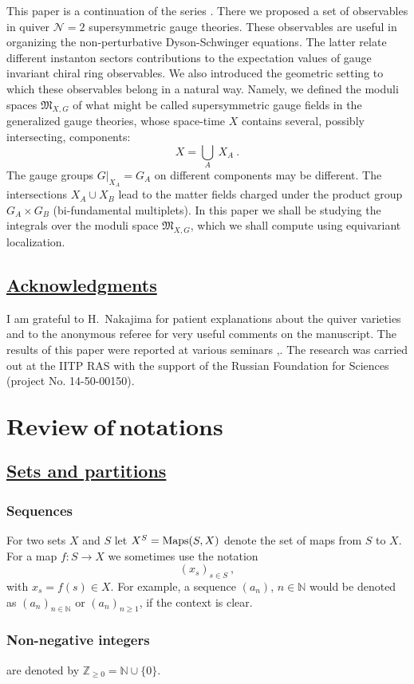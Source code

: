 \documentclass[12pt]{amsart}
\newcommand {\3}{\underline{\bf 3}}
\newcommand {\4}{\underline{\bf 4}}
\newcommand {\6}{\underline{\bf 6}}
\newcommand{\beq}{\begin{equation}}
\newcommand{\eeq}{\end{equation}}
\newcommand{\mM}{{\mathfrak M}}
\newcommand {\BN}   {\mathbb N}
\newcommand {\BZ}   {\mathbb Z}
\newcommand {\CalN} {\mathcal N}
\newcommand{\subsec}[1]{\subsection{\underline{\bf #1}}}
\newcommand{\secc}[1]{\section{$\mathbf{ #1}$}}
\begin{document}
This paper is a continuation of the series \cite{Nekrasov:2015wsu, Nekrasov:2016qym}. 
There we proposed a set of observables in quiver ${\CalN}=2$ supersymmetric gauge theories. These observables
are useful in organizing the non-perturbative Dyson-Schwinger equations. The latter relate different instanton sectors contributions to the expectation values of gauge invariant chiral ring observables. We also introduced the geometric
setting to which these observables belong in a natural way. Namely, we defined the moduli spaces ${\mM}_{X, G}$ of what might be called supersymmetric gauge fields in the generalized gauge theories, whose space-time $X$ contains several, possibly intersecting, components:
\beq
X = \bigcup\limits_{A}\ X_{A}\ . 
\eeq
The gauge groups $G\vert_{X_{A}} = G_{A}$ on different components may be different. The intersections $X_{A} \cup X_{B}$ lead to the matter fields charged under the product group $G_{A} \times G_{B}$ (bi-fundamental multiplets).  In this paper we shall be studying the integrals over the moduli space ${\mM}_{X,G}$, which we shall compute using equivariant localization. 


\subsec{Acknowledgments}

I am grateful to H.~Nakajima for patient explanations about the quiver varieties and to the anonymous referee for very useful comments on the manuscript. 
The results of this paper were reported at various seminars \cite{Nekrasov:IPPI},\cite{Nekrasov:SCGP}. 
The  research  was  carried  out  at  the  IITP RAS  with the support  of  the  Russian  Foundation  for  Sciences (project No. 14-50-00150). 


\secc{Review\ of\ notations}\label{aba:sec2}


\subsec{Sets and partitions}


\subsubsection{Sequences}
For two sets $X$ and $S$ let $X^{S} = {\rm Maps}(S, X)$ denote the set of maps from $S$
to $X$. For a map $f: S \to X$ we sometimes use the notation
 \beq
 (x_{s})_{s\in S} \ ,
 \label{eq:mnot}
 \eeq with $x_{s} = f(s) \in X$. For example, a sequence $(a_{n})$, $n \in {\BN}$ would be denoted as $(a_{n})_{n \in {\BN}}$ or $(a_{n})_{n \geq 1}$, if the context is clear. 
 
 
\subsubsection{Non-negative integers} 
are denoted by ${\BZ}_{\geq 0} = {\BN} \cup \{0 \}$. 
\end{document}
